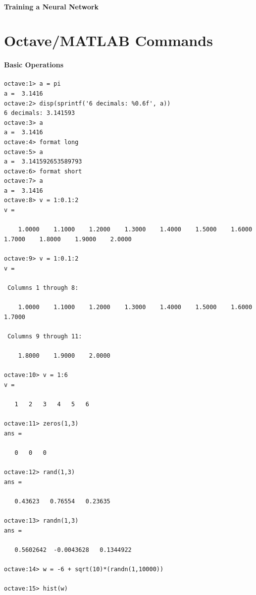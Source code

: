\documentclass[12pt]{report}
\begin{document}
    \subsubsection{Training a Neural Network}


\chapter{Octave/MATLAB Commands}

\subsubsection{Basic Operations}
\begin{lstlisting}[basicstyle=\small]
octave:1> a = pi
a =  3.1416
octave:2> disp(sprintf('6 decimals: %0.6f', a))
6 decimals: 3.141593
octave:3> a
a =  3.1416
octave:4> format long
octave:5> a
a =  3.141592653589793
octave:6> format short
octave:7> a
a =  3.1416
octave:8> v = 1:0.1:2
v =

    1.0000    1.1000    1.2000    1.3000    1.4000    1.5000    1.6000    1.7000    1.8000    1.9000    2.0000

octave:9> v = 1:0.1:2
v =

 Columns 1 through 8:

    1.0000    1.1000    1.2000    1.3000    1.4000    1.5000    1.6000    1.7000

 Columns 9 through 11:

    1.8000    1.9000    2.0000

octave:10> v = 1:6
v =

   1   2   3   4   5   6

octave:11> zeros(1,3)
ans =

   0   0   0

octave:12> rand(1,3)
ans =

   0.43623   0.76554   0.23635

octave:13> randn(1,3)
ans =

   0.5602642  -0.0043628   0.1344922

octave:14> w = -6 + sqrt(10)*(randn(1,10000))

octave:15> hist(w)
\end{lstlisting}
\end{document}
